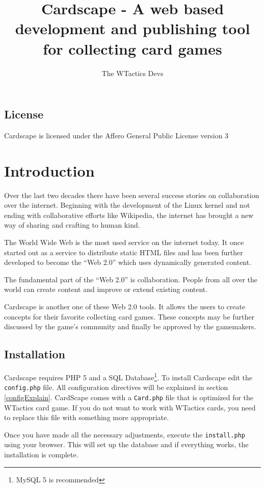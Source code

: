 \documentclass[a4paper, 11pt]{scrbook}
\title{Cardscape - A web based development and publishing tool for collecting card games}
\author{The WTactics Devs} %
\begin{document}
\maketitle
\tableofcontents

\section{License}
Cardscape is licensed under the Affero General Public License version 3%

\chapter{Introduction}
Over the last two decades there have been several success stories on collaboration over the internet. Beginning with the development of the Linux kernel and not ending with collaborative efforts like Wikipedia, the internet has brought a new way of sharing and crafting to human kind.

The World Wide Web is the most used service on the internet today. It once started out as a service to distribute static HTML files and has been further developed to become the ``Web 2.0'' which uses dynamically generated content.

The fundamental part of the ``Web 2.0'' is collaboration. People from all over the world can create content and improve or extend existing content.

Cardscape is another one of these Web 2.0 tools. It allows the users to create concepts for their favorite collecting card games. These concepts may be further discussed by the game's community and finally be approved by the gamemakers.

\section{Installation}
Cardscape requires PHP 5 and a SQL Database\footnote{MySQL 5 is recommended}. To install Cardscape edit the \texttt{config.php} file. All configuration directives will be explained in section \ref{configExplain}. CardScape comes with a \texttt{Card.php} file that is optimized for the WTactics card game. If you do not want to work with WTactics cards, you need to replace this file with something more appropriate.

Once you have made all the necessary adjustments, execute the \texttt{install.php} using your browser. This will set up the database and if everything works, the installation is complete.
\end{document}
